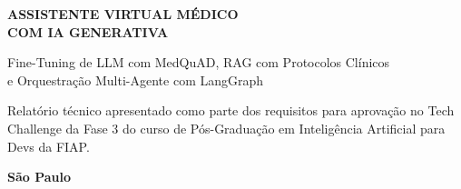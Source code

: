 \begin{titlepage}
    \vspace*{2cm}

    \begin{center}
        {\Large\bfseries\sffamily\gruponome}
    \end{center}

    \vspace{4cm}

    \begin{center}
        {\LARGE\bfseries\sffamily
        ASSISTENTE VIRTUAL MÉDICO\\[0.3cm]
        COM IA GENERATIVA}

        \vspace{0.5cm}

        {\large\sffamily
        Fine-Tuning de LLM com MedQuAD, RAG com Protocolos Clínicos\\[0.2cm]
        e Orquestração Multi-Agente com LangGraph}
    \end{center}

    \vspace{3cm}

    \begin{flushright}
        \begin{minipage}{0.5\textwidth}
            \setlength{\parindent}{0pt}
            \setlength{\parskip}{0.3cm}

            Relatório técnico apresentado como parte dos requisitos para aprovação no Tech Challenge da Fase 3 do curso de Pós-Graduação em Inteligência Artificial para Devs da FIAP.

        \end{minipage}
    \end{flushright}

    \vfill

    \begin{center}
        {\large\bfseries São Paulo}\\[0.2cm]
        {\large\dataconclusao}
    \end{center}

\end{titlepage}
